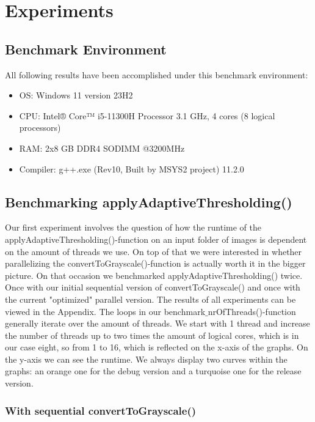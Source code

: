 \documentclass[sigconf]{acmart}
\begin{document}
\section{Experiments}

\subsection{Benchmark Environment}

All following results have been accomplished under this benchmark environment:

\begin{itemize}
    \item OS: Windows 11 version 23H2
    \item CPU: Intel® Core™ i5-11300H Processor 3.1 GHz, 4 cores (8 logical processors)
    \item RAM: 2x8 GB DDR4 SODIMM @3200MHz
    \item Compiler: g++.exe (Rev10, Built by MSYS2 project) 11.2.0
\end{itemize}



\subsection{Benchmarking applyAdaptiveThresholding()}

Our first experiment involves the question of how the runtime of the applyAdaptiveThresholding()-function on an input folder of images is dependent on the amount of threads we use. On top of that we were interested in whether parallelizing the convertToGrayscale()-function is actually worth it in the bigger picture. On that occasion we benchmarked applyAdaptiveThresholding() twice. Once with our initial sequential version of convertToGrayscale() and once with the current "optimized" parallel version. The results of all experiments can be viewed in the Appendix. The loops in our benchmark$\_$nrOfThreads()-function generally iterate over the amount of threads. We start with 1 thread and increase the number of threads up to two times the amount of logical cores, which is in our case eight, so from 1 to 16, which is reflected on the x-axis of the graphs. On the y-axis we can see the runtime. We always display two curves within the graphs: an orange one for the debug version and a turquoise one for the release version.

\subsubsection{With sequential convertToGrayscale()} 
\end{document}

